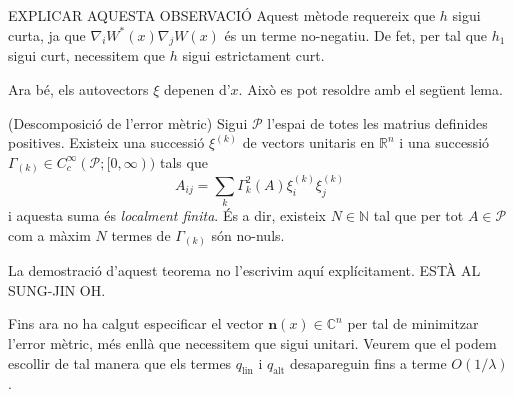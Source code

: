 \begin{obs}
    {\color{blue} EXPLICAR AQUESTA OBSERVACIÓ}
    Aquest mètode requereix que $h$ sigui curta, ja que $\nabla_i W^*(x) \nabla_jW(x)$ és un terme no-negatiu. De fet, per tal que $h_1$ sigui curt, necessitem que $h$ sigui estrictament curt.
\end{obs}
Ara bé, els autovectors $\xi$ depenen d'$x$. Això es pot resoldre amb el següent lema.
\begin{lema}\label{lema:descomposicio_error_metric} (Descomposició de l'error mètric)
    Sigui $\mathcal P$ l'espai de totes les matrius definides positives. Existeix una successió $\xi^{(k)}$ de vectors unitaris en $\mathbb R^n$ i una successió $\Gamma_{(k)}\in C_c^\infty(\mathcal P; [0,\infty))$ tals que
    \begin{equation*}
        A_{ij} = \sum_k\Gamma^2_{k}(A)\xi_i^{(k)}\xi_j^{(k)}
    \end{equation*}
    i aquesta suma és \textit{localment finita}. És a dir, existeix $N\in\mathbb N$ tal que per tot $A\in\mathcal P$ com a màxim $N$ termes de $\Gamma_{(k)}$ són no-nuls.
\end{lema}
\begin{obs}
    La demostració d'aquest teorema no l'escrivim aquí explícitament. {\color{blue} ESTÀ AL SUNG-JIN OH.}
\end{obs}
Fins ara no ha calgut especificar el vector $\textbf{n}(x)\in\mathbb C^n$ per tal de minimitzar l'error mètric, més enllà que necessitem que sigui unitari. Veurem que el podem escollir de tal manera que els termes $q_{\text{lin}}$ i $q_{\text{alt}}$ desapareguin fins a terme $O(1/\lambda)$.
